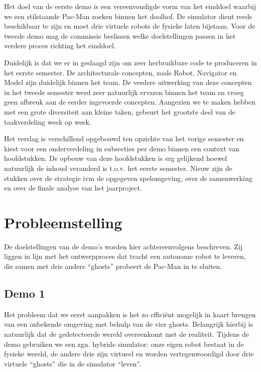 \documentclass[12pt,a4paper]{report}
\begin{document}
Het doel van de eerste demo is een vereenvoudigde vorm van het einddoel waarbij we een stilstaande Pac-Man zoeken binnen het doolhof. De simulator dient  reeds beschikbaar te zijn en moet drie virtuele robots de fysieke laten bijstaan. Voor de tweede demo mag de commissie beslissen welke doelstellingen passen in het verdere proces richting het einddoel.

Duidelijk is dat we er in geslaagd zijn om zeer herbruikbare code te produceren in het eerste semester. De architecturale concepten, zoals Robot, Navigator en Model zijn duidelijk binnen het team. De verdere uitwerking van deze concepten in het tweede semester werd zeer natuurlijk ervaren binnen het team en vroeg geen afbreuk aan de eerder ingevoerde concepten. Aangezien we te maken hebben met een grote diversiteit aan kleine taken, gebeurt het grootste deel van de taakverdeling week op week.

Het verslag is verschillend opgebouwd ten opzichte van het vorige semester en kiest voor een onderverdeling in subsecties per demo binnen een context van hoofdstukken. De opbouw van deze hoofdstukken is erg gelijkend hoewel natuurlijk de inhoud veranderd is t.o.v. het eerste semester. Nieuw zijn de stukken over de strategie ivm de opgegeven spelomgeving, over de samenwerking en over de finale analyse van het jaarproject.

\chapter{Probleemstelling}

De doelstellingen van de demo's worden hier achtereenvolgens beschreven. Zij liggen in lijn met het ontwerpproces dat tracht een autonome robot te leveren, die samen met drie andere ``ghosts'' probeert de Pac-Man in te sluiten.

\section{Demo 1}

Het probleem dat we eerst aanpakken is het zo effici\"ent mogelijk in kaart brengen van een onbekende omgeving met behulp van de vier ghosts. Belangrijk hierbij is natuurlijk dat de gedetecteerde wereld overeenkomt met de realiteit. Tijdens de demo gebruiken we een zgn. hybride simulator: onze eigen robot bestaat in de fysieke wereld, de andere drie zijn virtueel en worden vertegenwoordigd door drie virtuele ``ghosts'' die in de simulator ``leven''.
\end{document}
